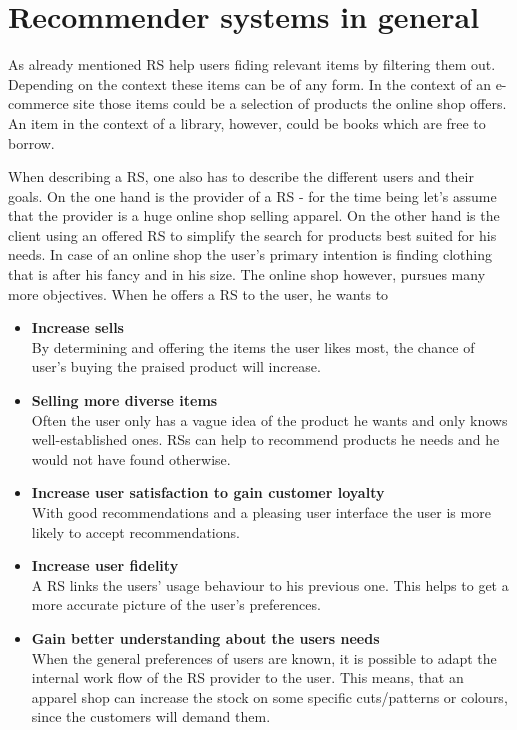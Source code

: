 

\section{Recommender systems in general}
As already mentioned RS help users fiding relevant items by filtering them out.
Depending on the context these items can be of any form.
In the context of an e-commerce site those items could be a selection of products the online shop offers.
An item in the context of a library, however, could be books which are free to borrow.
\citep[p.~377-378]{burke:2007}

When describing a RS, one also has to describe the different users and their goals.
On the one hand is the provider of a RS - for the time being let's assume that the provider is a huge online shop selling apparel.
On the other hand is the client using an offered RS to simplify the search for products best suited for his needs.
In case of an online shop the user's primary intention is finding clothing that is after his fancy and in his size.
The online shop however, pursues many more objectives.
When he offers a RS to the user, he wants to
\begin{itemize}
    \item\textbf{Increase sells}\hfill\\
        By determining and offering the items the user likes most, the chance of user's buying the praised product will increase.
    \item\textbf{Selling more diverse items}\hfill\\
        Often the user only has a vague idea of the product he wants and only knows well-established ones.
        RSs can help to recommend products he needs and he would not have found otherwise.
    \item\textbf{Increase user satisfaction to gain customer loyalty}\hfill\\
        With good recommendations and a pleasing user interface the user is more likely to accept recommendations.
    \item\textbf{Increase user fidelity}\hfill\\
        A RS links the users' usage behaviour to his previous one.
        This helps to get a more accurate picture of the user's preferences.
    \item\textbf{Gain better understanding about the users needs}\hfill\\
        When the general preferences of users are known, it is possible to adapt the internal work flow of the RS provider to the user.
        This means, that an apparel shop can increase the stock on some specific cuts/patterns or colours, since the customers will demand them.
\end{itemize}
